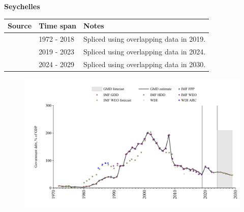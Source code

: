 \documentclass[12pt,a4paper,landscape]{article}
\begin{document}
\begin{adjustbox}{max totalsize={\paperwidth}{\paperheight},center}
\begin{minipage}[t][\textheight][t]{\textwidth}
\vspace*{0.5cm}
{}
\begin{center}
{\Large\bfseries Seychelles}
\end{center}
\vspace{0.5cm}
\begin{table}[H]
\centering
\small
\begin{tabular}{|l|l|l|}
\hline
\textbf{Source} & \textbf{Time span} & \textbf{Notes} \\
\hline
\rowcolor{white}\cite{IMF_GDD}& 1972 - 2018 &Spliced using overlapping data in 2019.\\
\rowcolor{lightgray}\cite{IMF_FPP}& 2019 - 2023 &Spliced using overlapping data in 2024.\\
\rowcolor{white}\cite{IMF_WEO_forecast}& 2024 - 2029 &Spliced using overlapping data in 2030.\\
\hline
\end{tabular}
\end{table}
\begin{figure}[H]
\centering
\includegraphics[width=\textwidth,height=0.6\textheight,keepaspectratio]{graphs/SYC_govdebt_GDP.pdf}
\end{figure}
\end{minipage}
\end{adjustbox}
\end{document}
